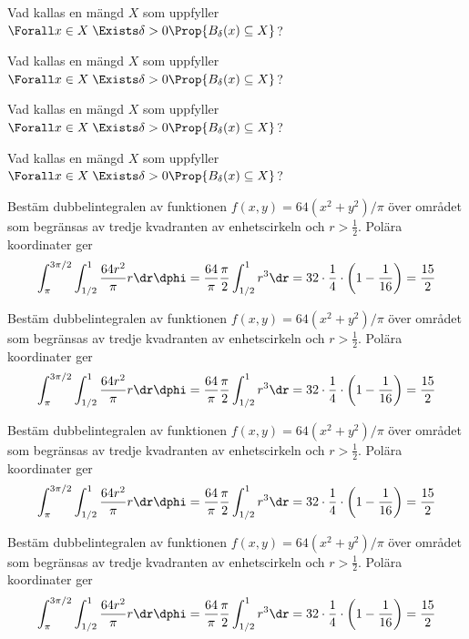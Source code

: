 Vad kallas en mängd $X$ som uppfyller
$\Forall x \in X \; \Exists \delta > 0 \Prop{B_{\delta}(x) \subseteq  X}$?
%

Vad kallas en mängd $X$ som uppfyller
$\Forall x \in X \; \Exists \delta > 0 \Prop{B_{\delta}(x) \subseteq  X}$?
%

Vad kallas en mängd $X$ som uppfyller
$\Forall x \in X \; \Exists \delta > 0 \Prop{B_{\delta}(x) \subseteq  X}$?
%

Vad kallas en mängd $X$ som uppfyller
$\Forall x \in X \; \Exists \delta > 0 \Prop{B_{\delta}(x) \subseteq  X}$?
%

Bestäm dubbelintegralen av funktionen $f(x, y) = 64(x^2 + y^2)/\pi$ över området
som begränsas av tredje kvadranten av enhets\-cirkeln och $r > \tfrac12$.
Polära koordinater ger
\begin{align*}
  \int_{\pi}^{3\pi/2}\int_{1/2}^1 \frac{64r^2}{\pi} r\dr\dphi
  = \frac{64}{\pi}\frac{\pi}{2} \int_{1/2}^1 r^3\dr
  = 32 \cdot \frac{1}{4} \cdot \left(1 - \frac1{16}\right) = \frac{15}2
\end{align*}
%

Bestäm dubbelintegralen av funktionen $f(x, y) = 64(x^2 + y^2)/\pi$ över området
som begränsas av tredje kvadranten av enhets\-cirkeln och $r > \tfrac12$.
Polära koordinater ger
\begin{align*}
  \int_{\pi}^{3\pi/2}\int_{1/2}^1 \frac{64r^2}{\pi} r\dr\dphi
  = \frac{64}{\pi}\frac{\pi}{2} \int_{1/2}^1 r^3\dr
  = 32 \cdot \frac{1}{4} \cdot \left(1 - \frac1{16}\right) = \frac{15}2
\end{align*}
%

Bestäm dubbelintegralen av funktionen $f(x, y) = 64(x^2 + y^2)/\pi$ över området
som begränsas av tredje kvadranten av enhets\-cirkeln och $r > \tfrac12$.
Polära koordinater ger
\begin{align*}
  \int_{\pi}^{3\pi/2}\int_{1/2}^1 \frac{64r^2}{\pi} r\dr\dphi
  = \frac{64}{\pi}\frac{\pi}{2} \int_{1/2}^1 r^3\dr
  = 32 \cdot \frac{1}{4} \cdot \left(1 - \frac1{16}\right) = \frac{15}2
\end{align*}
%

Bestäm dubbelintegralen av funktionen $f(x, y) = 64(x^2 + y^2)/\pi$ över området
som begränsas av tredje kvadranten av enhets\-cirkeln och $r > \tfrac12$.
Polära koordinater ger
\begin{align*}
  \int_{\pi}^{3\pi/2}\int_{1/2}^1 \frac{64r^2}{\pi} r\dr\dphi
  = \frac{64}{\pi}\frac{\pi}{2} \int_{1/2}^1 r^3\dr
  = 32 \cdot \frac{1}{4} \cdot \left(1 - \frac1{16}\right) = \frac{15}2
\end{align*}
%

